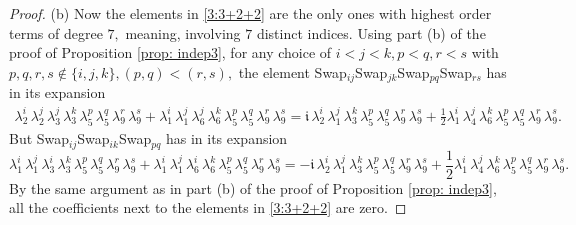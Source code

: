 \documentclass[12pt,dvipsnames,accepted=2016-08-18,a4paper,onecolumn]{quantumarticle}
\numberwithin{equation}{section}
\theoremstyle{definition}
\begin{document}
\begin{proof}
 (b) Now the elements in \eqref{3:3+2+2} are the only ones with highest order terms of degree $7,$ meaning, involving $7$ distinct indices. Using part (b) of the proof of Proposition \ref{prop: indep3}, for any choice of $i < j < k, p<q, r<s$ with $p,q,r,s \notin \{i,j,k\}, (p,q)<(r,s),$  the element Swap$_{ij}$Swap$_{jk}$Swap$_{pq}$Swap$_{rs}$ has in its expansion
	\begin{align*}
		\lambda_2^i\, \lambda_2^j\, \lambda_3^j\, \lambda_3^k\, \lambda_5^p\, \lambda_5^q\, \lambda_9^r\, \lambda_9^s + \lambda_1^i\, \lambda_1^j\, \lambda_6^j\, \lambda_6^k\, \lambda_5^p\, \lambda_5^q\, \lambda_9^r\, \lambda_9^s =
		\mathfrak{i}\,\lambda_2^i\, \lambda_1^j\, \lambda_3^k\, \lambda_5^p\, \lambda_5^q\, \lambda_9^r\, \lambda_9^s + \frac{1}{2} \lambda_1^i\, \lambda_4^j\, \lambda_6^k\, \lambda_5^p\, \lambda_5^q\, \lambda_9^r\, \lambda_9^s.
	\end{align*}
	But Swap$_{ij}$Swap$_{ik}$Swap$_{pq}$ has in its expansion
	$$
	\lambda_1^i\, \lambda_1^j\, \lambda_3^i\, \lambda_3^k\, \lambda_5^p\, \lambda_5^q\, \lambda_9^r\, \lambda_9^s + \lambda_1^i\, \lambda_1^j\, \lambda_6^i\, \lambda_6^k\, \lambda_5^p\, \lambda_5^q\, \lambda_9^r\, \lambda_9^s =
	-\mathfrak{i}\,\lambda_2^i\, \lambda_1^j\, \lambda_3^k\, \lambda_5^p\, \lambda_5^q\, \lambda_9^r\, \lambda_9^s + \frac{1}{2} \lambda_1^i\, \lambda_4^j\, \lambda_6^k\, \lambda_5^p\, \lambda_5^q\, \lambda_9^r\, \lambda_9^s.
	$$
	By the same argument as in part (b) of the proof of Proposition \ref{prop: indep3}, all the coefficients next to the elements in \eqref{3:3+2+2} are zero.


\end{proof}
\end{document}
